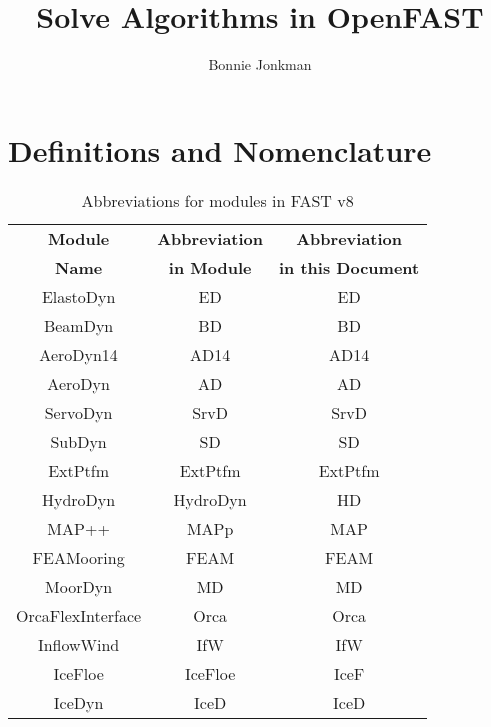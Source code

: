 \documentclass[10pt,letterpaper,oneside,notitlepage]{article}
\begin{document}
\title{Solve Algorithms in OpenFAST}
\author{Bonnie Jonkman}
\maketitle


\section{Definitions and Nomenclature}


\begin{table}[h]
   \centering
      \begin{tabular}{c|c|c}
      \textbf{Module} & \textbf{Abbreviation} & \textbf{Abbreviation}\\
      \textbf{Name}   & \textbf{in Module}    & \textbf{in this Document}\\
      \hline 
      ElastoDyn          & ED                    & ED        \\
      BeamDyn            & BD                    & BD        \\
      AeroDyn14          & AD14                  & AD14      \\
      AeroDyn            & AD                    & AD        \\
      ServoDyn           & SrvD                  & SrvD      \\
      SubDyn             & SD                    & SD        \\
      ExtPtfm            & ExtPtfm               & ExtPtfm   \\
      HydroDyn           & HydroDyn              & HD        \\
      MAP++              & MAPp                  & MAP       \\
      FEAMooring         & FEAM                  & FEAM      \\
      MoorDyn            & MD                    & MD        \\
      OrcaFlexInterface  & Orca                  & Orca      \\
      InflowWind         & IfW                   & IfW       \\   
      IceFloe            & IceFloe               & IceF      \\   
      IceDyn             & IceD                  & IceD      \\   
      \end{tabular}
   \caption{Abbreviations for modules in FAST v8}
   \label{tab:Abbrev}
\end{table}
\end{document}
